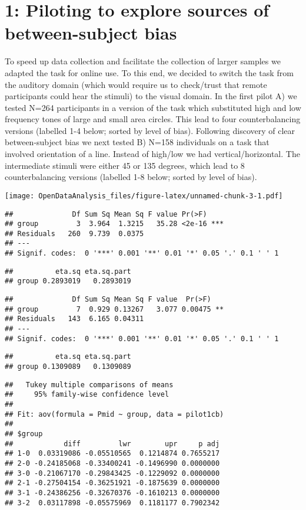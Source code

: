 \documentclass[]{article}
\begin{document}
\section{1: Piloting to explore sources of between-subject
bias}\label{piloting-to-explore-sources-of-between-subject-bias}

To speed up data collection and facilitate the collection of larger
samples we adapted the task for online use. To this end, we decided to
switch the task from the auditory domain (which would require us to
check/trust that remote participants could hear the stimuli) to the
visual domain. In the first pilot A) we tested N=264 participants in a
version of the task which substituted high and low frequency tones of
large and small area circles. This lead to four counterbalancing
versions (labelled 1-4 below; sorted by level of bias). Following
discovery of clear between-subject bias we next tested B) N=158
individuals on a task that involved orientation of a line. Instead of
high/low we had vertical/horizontal. The intermediate stimuli were
either 45 or 135 degrees, which lead to 8 counterbalancing versions
(labelled 1-8 below; sorted by level of bias).

\texttt{[image: OpenDataAnalysis\_files/figure-latex/unnamed-chunk-3-1.pdf]}

\begin{verbatim}
##              Df Sum Sq Mean Sq F value Pr(>F)    
## group         3  3.964  1.3215   35.28 <2e-16 ***
## Residuals   260  9.739  0.0375                   
## ---
## Signif. codes:  0 '***' 0.001 '**' 0.01 '*' 0.05 '.' 0.1 ' ' 1
\end{verbatim}

\begin{verbatim}
##          eta.sq eta.sq.part
## group 0.2893019   0.2893019
\end{verbatim}

\begin{verbatim}
##              Df Sum Sq Mean Sq F value  Pr(>F)   
## group         7  0.929 0.13267   3.077 0.00475 **
## Residuals   143  6.165 0.04311                   
## ---
## Signif. codes:  0 '***' 0.001 '**' 0.01 '*' 0.05 '.' 0.1 ' ' 1
\end{verbatim}

\begin{verbatim}
##          eta.sq eta.sq.part
## group 0.1309089   0.1309089
\end{verbatim}

\begin{verbatim}
##   Tukey multiple comparisons of means
##     95% family-wise confidence level
## 
## Fit: aov(formula = Pmid ~ group, data = pilot1cb)
## 
## $group
##            diff         lwr        upr     p adj
## 1-0  0.03319086 -0.05510565  0.1214874 0.7655217
## 2-0 -0.24185068 -0.33400241 -0.1496990 0.0000000
## 3-0 -0.21067170 -0.29843425 -0.1229092 0.0000000
## 2-1 -0.27504154 -0.36251921 -0.1875639 0.0000000
## 3-1 -0.24386256 -0.32670376 -0.1610213 0.0000000
## 3-2  0.03117898 -0.05575969  0.1181177 0.7902342
\end{verbatim}
\end{document}
